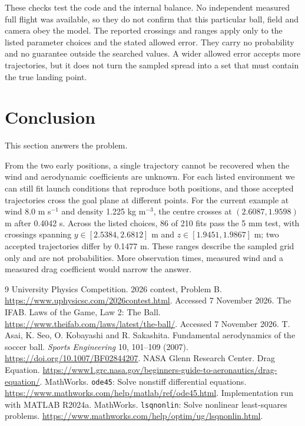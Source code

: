 \documentclass[11pt,a4paper]{article}
\begin{document}
These checks test the code and the internal balance. No independent measured full flight was available, so they do not confirm that this particular ball, field and camera obey the model. The reported crossings and ranges apply only to the listed parameter choices and the stated allowed error. They carry no probability and no guarantee outside the searched values. A wider allowed error accepts more trajectories, but it does not turn the sampled spread into a set that must contain the true landing point.

\clearpage
\section{Conclusion}
This section answers the problem.

From the two early positions, a single trajectory cannot be recovered when the wind and aerodynamic coefficients are unknown. For each listed environment we can still fit launch conditions that reproduce both positions, and those accepted trajectories cross the goal plane at different points. For the current example at wind 8.0 m s$^{-1}$ and density 1.225 kg m$^{-3}$, the centre crosses at $(2.6087,1.9598)$ m after 0.4042 s. Across the listed choices, 86 of 210 fits pass the 5 mm test, with crossings spanning $y\in[2.5384,2.6812]$ m and $z\in[1.9451,1.9867]$ m; two accepted trajectories differ by 0.1477 m. These ranges describe the sampled grid only and are not probabilities. More observation times, measured wind and a measured drag coefficient would narrow the answer.

\begingroup\small\raggedright
\begin{thebibliography}{9}
 University Physics Competition. 2026 contest, Problem B. \url{https://www.uphysicsc.com/2026contest.html}. Accessed 7 November 2026.
 The IFAB. Laws of the Game, Law 2: The Ball. \url{https://www.theifab.com/laws/latest/the-ball/}. Accessed 7 November 2026.
 T. Asai, K. Seo, O. Kobayashi and R. Sakashita. Fundamental aerodynamics of the soccer ball. \emph{Sports Engineering} 10, 101--109 (2007). \url{https://doi.org/10.1007/BF02844207}.
 NASA Glenn Research Center. Drag Equation. \url{https://www1.grc.nasa.gov/beginners-guide-to-aeronautics/drag-equation/}.
 MathWorks. \texttt{ode45}: Solve nonstiff differential equations. \url{https://www.mathworks.com/help/matlab/ref/ode45.html}. Implementation run with MATLAB R2024a.
 MathWorks. \texttt{lsqnonlin}: Solve nonlinear least-squares problems. \url{https://www.mathworks.com/help/optim/ug/lsqnonlin.html}.
\end{thebibliography}
\end{document}
